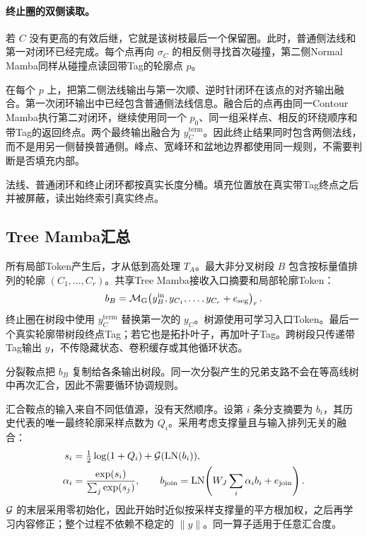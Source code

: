 \paragraph{终止圈的双侧读取。}
若 $C$ 没有更高的有效后继，它就是该树枝最后一个保留圈。此时，普通侧法线和第一对闭环已经完成。每个点再向 $\sigma_C$ 的相反侧寻找首次碰撞，第二侧Normal Mamba同样从碰撞点读回带Tag的轮廓点 $p$。

在每个 $p$ 上，把第二侧法线输出与第一次顺、逆时针闭环在该点的对齐输出融合。第一次闭环输出中已经包含普通侧法线信息。融合后的点再由同一Contour Mamba执行第二对闭环，继续使用同一个 $p_0$、同一组采样点、相反的环绕顺序和带Tag的返回终点。两个最终输出融合为 $y_C^{\mathrm{term}}$。因此终止结果同时包含两侧法线，而不是用另一侧替换普通侧。峰点、宽峰环和盆地边界都使用同一规则，不需要判断是否填充内部。

法线、普通闭环和终止闭环都按真实长度分桶。填充位置放在真实带Tag终点之后并被屏蔽，读出始终索引真实终点。

\subsection{Tree Mamba汇总}

所有局部Token产生后，才从低到高处理 $T_A$。最大非分叉树段 $B$ 包含按标量值排列的轮廓 $(C_1,\ldots,C_r)$。共享Tree Mamba接收入口摘要和局部轮廓Token：
\begin{equation}
b_B=\mathcal{M}_{\mathrm{G}}\!\left(y_B^{\mathrm{in}},y_{C_1},\ldots,y_{C_r}+e_{\mathrm{seg}}\right)_r.
\label{eq:branch-zh}
\end{equation}
终止圈在树段中使用 $y_C^{\mathrm{term}}$ 替换第一次的 $y_C$。树源使用可学习入口Token。最后一个真实轮廓带树段终点Tag；若它也是拓扑叶子，再加叶子Tag。跨树段只传递带Tag输出 $y$，不传隐藏状态、卷积缓存或其他循环状态。

分裂鞍点把 $b_B$ 复制给各条输出树段。同一次分裂产生的兄弟支路不会在等高线树中再次汇合，因此不需要循环协调规则。

汇合鞍点的输入来自不同低值源，没有天然顺序。设第 $i$ 条分支摘要为 $b_i$，其历史代表的唯一最终轮廓采样点数为 $Q_i$。采用考虑支撑量且与输入排列无关的融合：
\begin{align}
s_i&=\tfrac12\log(1+Q_i)+\mathcal{G}(\operatorname{LN}(b_i)),\\
\alpha_i&=\frac{\exp(s_i)}{\sum_j\exp(s_j)},\qquad
b_{\mathrm{join}}=\operatorname{LN}\!\left(W_J\sum_i\alpha_i b_i+e_{\mathrm{join}}\right).
\label{eq:join-zh}
\end{align}
$\mathcal{G}$ 的末层采用零初始化，因此开始时近似按采样支撑量的平方根加权，之后再学习内容修正；整个过程不依赖不稳定的 $\|y\|$。同一算子适用于任意汇合度。

